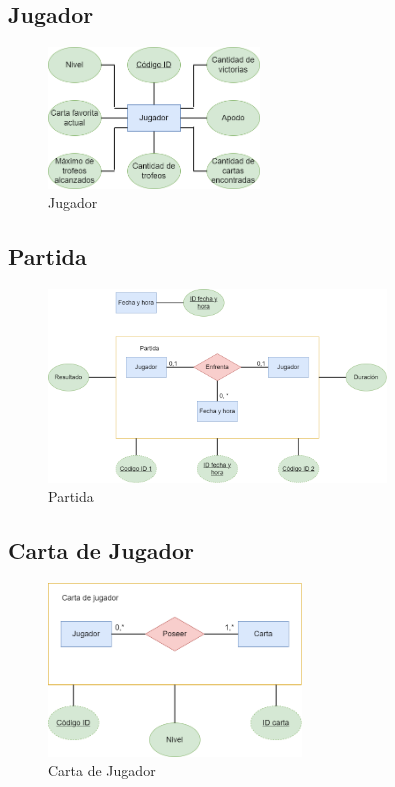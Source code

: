 \subsection*{Jugador}
\begin{figure}[H]
\centering
\includegraphics[width=0.5\textwidth]{../images/merx_player.png}
\caption{Jugador}
\end{figure}

\subsection*{Partida}
\begin{figure}[H]
\centering
\includegraphics[width=0.80\textwidth]{../images/merx_match.png}
\caption{Partida}
\end{figure}

\subsection*{Carta de Jugador}
\begin{figure}[H]
\centering
\includegraphics[width=0.60\textwidth]{../images/merx_playercard.png}
\caption{Carta de Jugador}
\end{figure}


